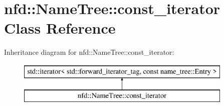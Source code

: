 \hypertarget{classnfd_1_1NameTree_1_1const__iterator}{}\section{nfd\+:\+:Name\+Tree\+:\+:const\+\_\+iterator Class Reference}
\label{classnfd_1_1NameTree_1_1const__iterator}
Inheritance diagram for nfd\+:\+:Name\+Tree\+:\+:const\+\_\+iterator\+:\begin{figure}[H]
\begin{center}
\leavevmode
\includegraphics[height=2.000000cm]{classnfd_1_1NameTree_1_1const__iterator}
\end{center}
\end{figure}
